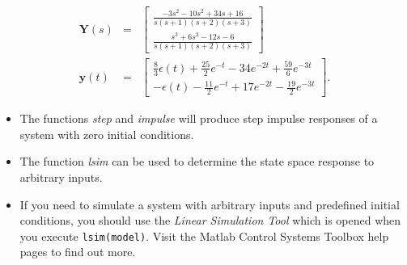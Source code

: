 \begin{slide}\label{slide:l4s17}
 \begin{eqnarray*}
\mathbf{Y}(s)&=& \left[\begin{array}{c}
  \frac{-3s^2-10s^2+34s+16}{s(s+1)(s+2)(s+3)} \\
  \frac{s^3+6s^2-12s-6}{s(s+1)(s+2)(s+3)}
\end{array}\right]\\
\mathbf{y}(t)&=& \left[\begin{array}{c}
  \frac{8}{3}\epsilon(t)+\frac{25}{2}e^{-t}-34e^{-2t}+\frac{59}{6}e^{-3t} \\
   -\epsilon(t)-\frac{11}{2}e^{-t}+17e^{-2t}-\frac{19}{2}e^{-3t}
\end{array}\right].
\end{eqnarray*}
\end{slide}

\begin{slide}
\begin{itemize}
	\item The functions \emph{step} and \emph{impulse} will produce step impulse responses of a system with zero initial conditions.
	\item The function \emph{lsim} can be used to determine the state space response to arbitrary inputs.
	\item If you need to simulate a system with arbitrary inputs and predefined initial conditions, you should use the \emph{Linear Simulation Tool} which is opened when you execute \texttt{lsim(model)}.
	Visit the Matlab Control Systems Toolbox help pages to find out more.
\end{itemize}
\end{slide}


